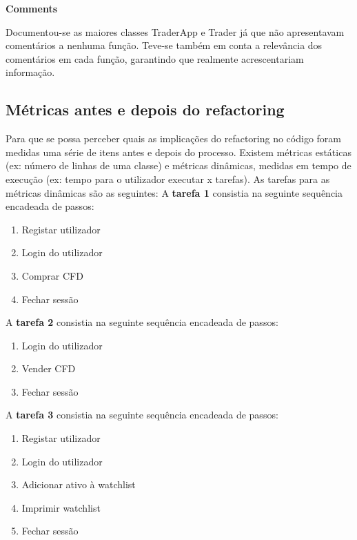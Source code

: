 \vspace{5mm}
\textbf{Comments}

Documentou-se as maiores classes TraderApp e Trader já que não apresentavam comentários a nenhuma função. Teve-se também em conta a relevância dos comentários em cada função, garantindo que realmente acrescentariam informação.

\subsection{Métricas antes e depois do refactoring}

Para que se possa perceber quais as implicações do refactoring no código foram medidas uma série de itens antes e depois do processo. Existem métricas estáticas (ex: número de linhas de uma classe) e métricas dinâmicas, medidas em tempo de execução (ex: tempo para o utilizador executar x tarefas).
As tarefas para as métricas dinâmicas são as seguintes:
\vspace{5mm}
\newline A \textbf{tarefa 1} consistia na seguinte sequência encadeada de passos:

\begin{enumerate}
    \item Registar utilizador
    \item Login do utilizador
    \item Comprar CFD
    \item Fechar sessão
\end{enumerate}

A \textbf{tarefa 2} consistia na seguinte sequência encadeada de passos:

\begin{enumerate}
    \item Login do utilizador
    \item Vender CFD
    \item Fechar sessão
\end{enumerate}

\newpage

A \textbf{tarefa 3} consistia na seguinte sequência encadeada de passos:

\begin{enumerate}
    \item Registar utilizador
    \item Login do utilizador
    \item Adicionar ativo à watchlist
    \item Imprimir watchlist
    \item Fechar sessão
\end{enumerate}


